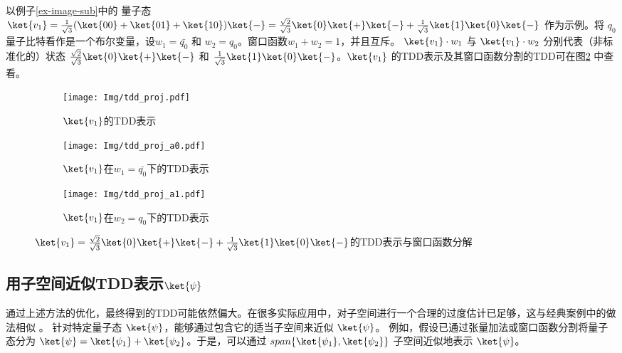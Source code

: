 \begin{example}
    以例子\ref{ex-image-sub}中的
    量子态 $\ket{v_1}=\frac{1}{\sqrt{3}}(\ket{00}+\ket{01}+\ket{10})\ket{-}=\frac{\sqrt{2}}{\sqrt{3}}\ket{0}\ket{+}\ket{-}+\frac{1}{\sqrt{3}}\ket{1}\ket{0}\ket{-}$ 作为示例。将 $q_0$ 量子比特看作是一个布尔变量，设$w_1=\bar{q_0}$ 和 $w_2=q_0$。窗口函数$w_1+w_2=1$，并且互斥。 $\ket{v_1}\cdot w_1$ 与 $\ket{v_1} \cdot w_2$ 分别代表（非标准化的）状态 $\frac{\sqrt{2}}{\sqrt{3}}\ket{0}\ket{+}\ket{-}$ 和 $\frac{1}{\sqrt{3}}\ket{1}\ket{0}\ket{-}$。$\ket{v_1}$ 的TDD表示及其窗口函数分割的TDD可在图\ref{fig:tdd-split} 中查看。
    \begin{figure}
    \centering
	\begin{subfigure}[b]{.3\textwidth}
        \centering
        \texttt{[image: Img/tdd\_proj.pdf]}
		\caption{$\ket{v_1}$的TDD表示}
        \label{fig:tdd-split-a}
	\end{subfigure}
	\begin{subfigure}[b]{.3\textwidth}
        \centering
        \texttt{[image: Img/tdd\_proj\_a0.pdf]}
		\caption{$\ket{v_1}$在$w_1=\bar{q_0}$下的TDD表示}
	\end{subfigure}
    \quad
    \begin{subfigure}[b]{.3\textwidth}
        \centering
        \texttt{[image: Img/tdd\_proj\_a1.pdf]}
		\caption{$\ket{v_1}$在$w_2=q_0$下的TDD表示}
	\end{subfigure}
    
    \caption{$\ket{v_1}=\frac{\sqrt{2}}{\sqrt{3}}\ket{0}\ket{+}\ket{-}+\frac{1}{\sqrt{3}}\ket{1}\ket{0}\ket{-}$的TDD表示与窗口函数分解}
    \label{fig:tdd-split}
    \end{figure}
\end{example}
\subsection*{用子空间近似TDD表示$\ket{\psi}$}
通过上述方法的优化，最终得到的TDD可能依然偏大。在很多实际应用中，对子空间进行一个合理的过度估计已足够，这与经典案例中的做法相似 \citep{Cho_1996,lin2014parallel,Wang+farside_iccad03}。
针对特定量子态 $\ket{\psi}$，能够通过包含它的适当子空间来近似 $\ket{\psi}$。
例如，假设已通过张量加法或窗口函数分割将量子态分为 $\ket{\psi} = \ket{\psi_1}+\ket{\psi_2}$。于是，可以通过 $span\{\ket{\psi_1},\ket{\psi_2}\}$ 子空间近似地表示 $\ket{\psi}$。

